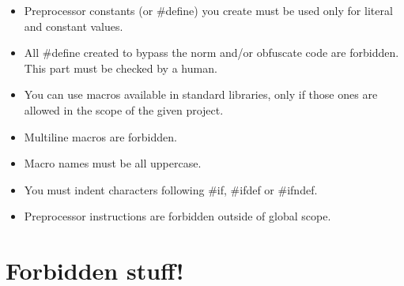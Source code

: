 \documentclass{42-ko}
\begin{document}
        \begin{itemize}

            \item Preprocessor constants (or \#define) you create must be used
                only for literal and constant values.
            \item All \#define created to bypass the norm and/or obfuscate
                code are forbidden. This part must be checked by a human.
            \item You can use macros available in standard libraries, only
                if those ones are allowed in the scope of the given project.
            \item Multiline macros are forbidden.
            \item Macro names must be all uppercase.
            \item You must indent characters following \#if, \#ifdef
                or \#ifndef.
            \item Preprocessor instructions are forbidden outside of global scope.

        \end{itemize}
        \newpage


    \section{Forbidden stuff!}
\end{document}
